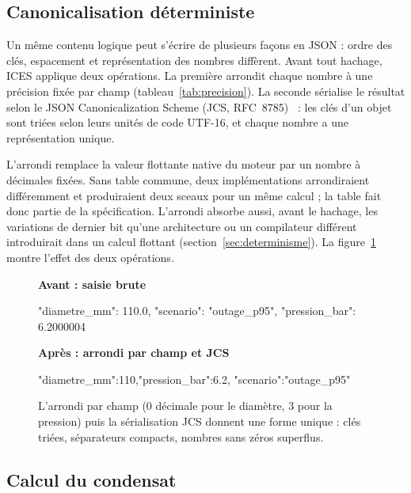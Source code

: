 \documentclass[11pt,a4paper]{article}
\begin{document}
\subsection{Canonicalisation déterministe}\label{sec:canon}

Un même contenu logique peut s'écrire de plusieurs façons en JSON : ordre des clés, espacement et représentation des nombres diffèrent. Avant tout hachage, ICES applique deux opérations. La première arrondit chaque nombre à une précision fixée par champ (tableau~\ref{tab:precision}). La seconde sérialise le résultat selon le JSON Canonicalization Scheme (JCS, RFC~8785)~\cite{rfc8785} : les clés d'un objet sont triées selon leurs unités de code UTF-16, et chaque nombre a une représentation unique.

L'arrondi remplace la valeur flottante native du moteur par un nombre à décimales fixées. Sans table commune, deux implémentations arrondiraient différemment et produiraient deux sceaux pour un même calcul ; la table fait donc partie de la spécification. L'arrondi absorbe aussi, avant le hachage, les variations de dernier bit qu'une architecture ou un compilateur différent introduirait dans un calcul flottant (section~\ref{sec:determinisme}). La figure~\ref{fig:avantapres} montre l'effet des deux opérations.

\begin{figure}[H]\centering
\begin{minipage}[t]{0.47\linewidth}
\textbf{\small Avant : saisie brute}
\begin{code}
{
  "diametre_mm": 110.0,
  "scenario": "outage_p95",
  "pression_bar": 6.2000004
}
\end{code}
\end{minipage}\hfill
\begin{minipage}[t]{0.47\linewidth}
\textbf{\small Après : arrondi par champ et JCS}
\begin{code}
{"diametre_mm":110,"pression_bar":6.2,
"scenario":"outage_p95"}
\end{code}
\end{minipage}
\caption{L'arrondi par champ (0 décimale pour le diamètre, 3 pour la pression) puis la sérialisation JCS donnent une forme unique : clés triées, séparateurs compacts, nombres sans zéros superflus.}\label{fig:avantapres}
\end{figure}

\subsection{Calcul du condensat}
\end{document}
